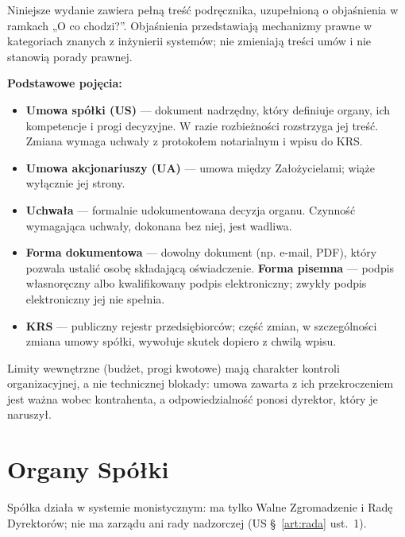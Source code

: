 \documentclass[11pt,a4paper]{report}
\begin{document}
\begin{OCoChodzi}
Niniejsze wydanie zawiera pełną treść podręcznika, uzupełnioną o objaśnienia w ramkach „O co chodzi?”. Objaśnienia przedstawiają mechanizmy prawne w kategoriach znanych z inżynierii systemów; nie zmieniają treści umów i nie stanowią porady prawnej.

\textbf{Podstawowe pojęcia:}
\begin{itemize}
  \item \textbf{Umowa spółki (US)} --- dokument nadrzędny, który definiuje organy, ich kompetencje i progi decyzyjne. W razie rozbieżności rozstrzyga jej treść. Zmiana wymaga uchwały z protokołem notarialnym i wpisu do KRS.
  \item \textbf{Umowa akcjonariuszy (UA)} --- umowa między Założycielami; wiąże wyłącznie jej strony.
  \item \textbf{Uchwała} --- formalnie udokumentowana decyzja organu. Czynność wymagająca uchwały, dokonana bez niej, jest wadliwa.
  \item \textbf{Forma dokumentowa} --- dowolny dokument (np. e-mail, PDF), który pozwala ustalić osobę składającą oświadczenie. \textbf{Forma pisemna} --- podpis własnoręczny albo kwalifikowany podpis elektroniczny; zwykły podpis elektroniczny jej nie spełnia.
  \item \textbf{KRS} --- publiczny rejestr przedsiębiorców; część zmian, w szczególności zmiana umowy spółki, wywołuje skutek dopiero z chwilą wpisu.
\end{itemize}
Limity wewnętrzne (budżet, progi kwotowe) mają charakter kontroli organizacyjnej, a nie technicznej blokady: umowa zawarta z ich przekroczeniem jest ważna wobec kontrahenta, a odpowiedzialność ponosi dyrektor, który je naruszył.
\end{OCoChodzi}

\section{Organy Spółki}

Spółka działa w systemie monistycznym: ma tylko Walne Zgromadzenie i Radę Dyrektorów; nie ma zarządu ani rady nadzorczej (US §~\ref{art:rada} ust.~1).
\end{document}

